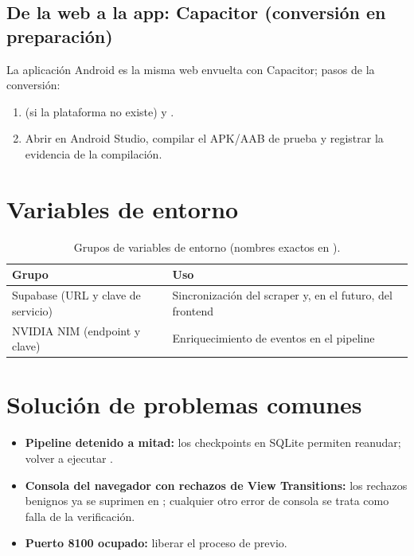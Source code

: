 \documentclass[11pt,a4paper]{article}
\begin{document}
\subsection{De la web a la app: Capacitor (conversión en preparación)}

La aplicación Android es la misma web envuelta con Capacitor; pasos de la
conversión:

\begin{enumerate}
  \item {} (si la plataforma no existe) y
        .
  \item Abrir en Android Studio, compilar el APK/AAB de prueba y registrar la
        evidencia de la compilación.
\end{enumerate}

\section{Variables de entorno}

\begin{table}[h!]
\centering\small
\begin{tabular}{@{}L{5.2cm}L{9.6cm}@{}}
\toprule
\textbf{Grupo} & \textbf{Uso} \\
\midrule
Supabase (URL y clave de servicio) & Sincronización del scraper y, en el futuro, del frontend \\
NVIDIA NIM (endpoint y clave) & Enriquecimiento de eventos en el pipeline \\
\bottomrule
\end{tabular}
\caption{Grupos de variables de entorno (nombres exactos en ).}
\end{table}

\section{Solución de problemas comunes}

\begin{itemize}
  \item \textbf{Pipeline detenido a mitad:} los checkpoints en SQLite permiten
        reanudar; volver a ejecutar .
  \item \textbf{Consola del navegador con rechazos de View Transitions:} los
        rechazos benignos ya se suprimen en ; cualquier otro
        error de consola se trata como falla de la verificación.
  \item \textbf{Puerto 8100 ocupado:} liberar el proceso de 
        previo.
\end{itemize}
\end{document}
